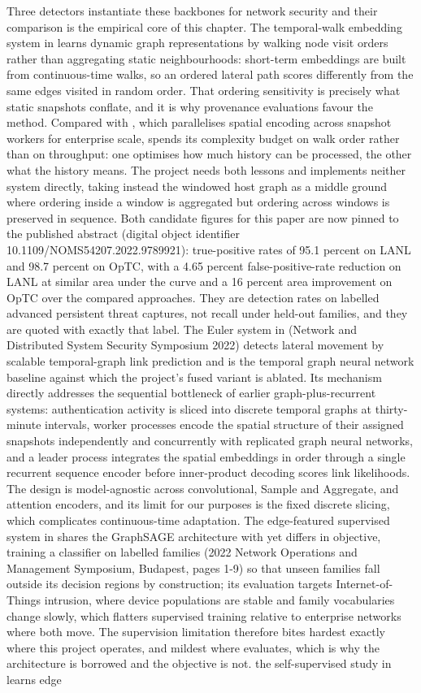 Three detectors instantiate these backbones for network security and their comparison is the empirical core of this chapter. The temporal-walk embedding system in \cite{k16} learns dynamic graph representations by walking node visit orders rather than aggregating static neighbourhoods: short-term embeddings are built from continuous-time walks, so an ordered lateral path scores differently from the same edges visited in random order. That ordering sensitivity is precisely what static snapshots conflate, and it is why provenance evaluations favour the method. Compared with \cite{k17}, which parallelises spatial encoding across snapshot workers for enterprise scale, \cite{k16} spends its complexity budget on walk order rather than on throughput: one optimises how much history can be processed, the other what the history means. The project needs both lessons and implements neither system directly, taking instead the windowed host graph as a middle ground where ordering inside a window is aggregated but ordering across windows is preserved in sequence. Both candidate figures for this paper are now pinned to the published abstract (digital object identifier 10.1109/NOMS54207.2022.9789921): true-positive rates of 95.1 percent on LANL and 98.7 percent on OpTC, with a 4.65 percent false-positive-rate reduction on LANL at similar area under the curve and a 16 percent area improvement on OpTC over the compared approaches. They are detection rates on labelled advanced persistent threat captures, not recall under held-out families, and they are quoted with exactly that label. The Euler system in \cite{k17} (Network and Distributed System Security Symposium 2022) detects lateral movement by scalable temporal-graph link prediction and is the temporal graph neural network baseline against which the project's fused variant is ablated. Its mechanism directly addresses the sequential bottleneck of earlier graph-plus-recurrent systems: authentication activity is sliced into discrete temporal graphs at thirty-minute intervals, worker processes encode the spatial structure of their assigned snapshots independently and concurrently with replicated graph neural networks, and a leader process integrates the spatial embeddings in order through a single recurrent sequence encoder before inner-product decoding scores link likelihoods. The design is model-agnostic across convolutional, Sample and Aggregate, and attention encoders, and its limit for our purposes is the fixed discrete slicing, which complicates continuous-time adaptation. The edge-featured supervised system in \cite{k18} shares the GraphSAGE architecture with \cite{k14} yet differs in objective, training a classifier on labelled families (2022 Network Operations and Management Symposium, Budapest, pages 1-9) so that unseen families fall outside its decision regions by construction; its evaluation targets Internet-of-Things intrusion, where device populations are stable and family vocabularies change slowly, which flatters supervised training relative to enterprise networks where both move. The supervision limitation therefore bites hardest exactly where this project operates, and mildest where \cite{k18} evaluates, which is why the architecture is borrowed and the objective is not. the self-supervised study in \cite{k19} learns edge 